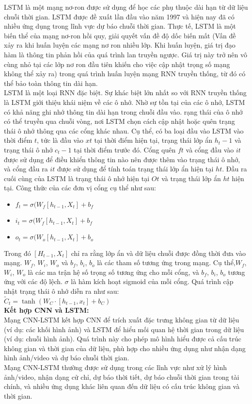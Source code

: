 \documentclass[conference]{IEEEtran}
\begin{document}
LSTM là một mạng nơ-ron được sử dụng để học các phụ thuộc dài hạn từ dữ liệu chuỗi thời gian. LSTM được đề xuất lần đầu vào năm 1997 và hiện nay đã có nhiều ứng dụng trong lĩnh vực dự báo chuỗi thời gian. Thực tế, LSTM là một biến thể của mạng nơ-ron hồi quy, giải quyết vấn đề độ dốc biến mất (Vấn đề xảy ra khi huấn luyện các mạng nơ ron nhiều lớp. Khi huấn luyện, giá trị đạo hàm là thông tin phản hồi của quá trình lan truyền ngược. Giá trị này trở nên vô cùng nhỏ tại các lớp nơ ron đầu tiên khiến cho việc cập nhật trọng số mạng không thể xảy ra) trong quá trình huấn luyện mạng RNN truyền thống, từ đó có thể bảo toàn thông tin dài hạn.\\
LSTM là một loại RNN đặc biệt. Sự khác biệt lớn nhất so với RNN truyền thống là LSTM giới thiệu khái niệm về các ô nhớ. Nhờ sự tồn tại của các ô nhớ, LSTM có khả năng ghi nhớ thông tin dài hạn trong chuỗi đầu vào. rạng thái của ô nhớ có thể truyền qua chuỗi vòng, nơi LSTM chọn cách cập nhật hoặc quên trạng thái ô nhớ thông qua các cổng khác nhau. Cụ thể, có ba loại đầu vào LSTM vào thời điểm $t$, tức là đầu vào $xt$ tại thời điểm hiện tại, trạng thái lớp ẩn $h_{t}-1$ và trạng thái ô nhớ $c_{t}-1$ tại thời điểm trước đó. Cổng quên $ft$ và cổng đầu vào $it$ được sử dụng để điều khiển thông tin nào nên được thêm vào trạng thái ô nhớ, và cổng đầu ra $it$ được sử dụng để tính toán trạng thái lớp ẩn hiện tại $ht$. Đầu ra cuối cùng của LSTM là trạng thái ô nhớ hiện tại $Ot$ và trạng thái lớp ẩn $ht$ hiện tại. Công thức của các đơn vị cổng cụ thể như sau:\\
\begin{itemize}
  \item $f_{t} = \sigma(W_{f}[h_{t-1}, X_{t}] + b_{f}$
  
  \item $i_{t} = \sigma(W_{f}[h_{t-1}, X_{t}] + b_{f}$
  
  \item $o_{t} = \sigma(W_{o}[h_{t-1}, X_{t}] + b_{o}$
\end{itemize}
Trong đó $[H_{t-1}, X_{t}]$ chỉ ra rằng lớp ẩn và dữ liệu chuỗi được đồng thời đưa vào mạng. $W_{f}$, $W_{i}$, $W_{o}$ và $b_{f}$, $b_{i}$, $b_{o}$ là các tham số tương ứng trong mạng. Cụ thể,$W_{f}$, $W_{i}$, $W_{o}$ là các ma trận hệ số trọng số tương ứng cho mỗi cổng, và $b_{f}$, $b_{i}$, $b_{o}$ tương ứng với các độ lệch. $\sigma$ là hàm kích hoạt sigmoid của mỗi cổng. Quá trình cập nhật trạng thái ô nhớ diễn ra như sau:\\

$\tilde{C}_t = \tanh(W_C \cdot [h_{t-1}, x_t] + b_C)$\\
\textbf{Kết hợp CNN và LSTM:}\\
Mạng CNN-LSTM kết hợp CNN để trích xuất đặc trưng không gian từ dữ liệu (ví dụ: các khối hình ảnh) và LSTM để hiểu mối quan hệ thời gian trong dữ liệu (ví dụ: chuỗi hình ảnh). Quá trình này cho phép mô hình hiểu được cả cấu trúc không gian và thời gian của dữ liệu, phù hợp cho nhiều ứng dụng như nhận dạng hình ảnh/video và dự báo chuỗi thời gian.\\
Mạng CNN-LSTM thường được sử dụng trong các lĩnh vực như xử lý hình ảnh/video, nhận dạng cử chỉ, dự báo thời tiết, dự báo chuỗi thời gian trong tài chính, và nhiều ứng dụng khác liên quan đến dữ liệu có cấu trúc không gian và thời gian.
\end{document}
